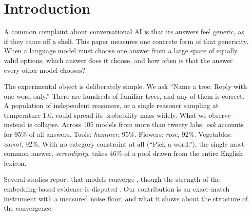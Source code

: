 \documentclass[11pt]{article}
\begin{document}
\section{Introduction}
\label{sec:intro}

A common complaint about conversational AI is that its answers feel generic, as if they came off a shelf. This paper measures one concrete form of that genericity. When a language model must choose one answer from a large space of equally valid options, which answer does it choose, and how often is that the answer every other model chooses?

The experimental object is deliberately simple. We ask ``Name a tree. Reply with one word only.'' There are hundreds of familiar trees, and any of them is correct. A population of independent reasoners, or a single reasoner sampling at temperature 1.0, could spread its probability mass widely. What we observe instead is collapse. Across 105 models from more than twenty labs, \emph{oak} accounts for 95\% of all answers. Tools: \emph{hammer}, 95\%. Flowers: \emph{rose}, 92\%. Vegetables: \emph{carrot}, 92\%. With no category constraint at all (``Pick a word.''), the single most common answer, \emph{serendipity}, takes 46\% of a pool drawn from the entire English lexicon.

Several studies report that models converge \citep{wenger2025different,jiang2025hivemind,zhang2025noveltybench}, though the strength of the embedding-based evidence is disputed \citep{schaeffer2026hivemind}. Our contribution is an exact-match instrument with a measured noise floor, and what it shows about the structure of the convergence:
\end{document}
